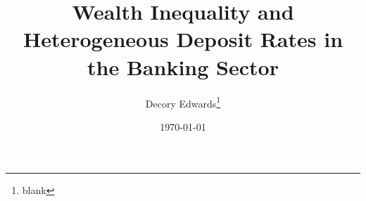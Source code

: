 \documentclass{article}
\title{Wealth Inequality and Heterogeneous Deposit Rates in the Banking Sector}
\author{Decory Edwards\thanks{blank}}
\date{\today}
\begin{document}
\maketitle


\vspace{2em}
\noindent
\begin{abstract}
  \noindent
  
\end{abstract}

\newpage






\FloatBarrier


\FloatBarrier


\clearpage


\printbibliography

\FloatBarrier
\clearpage
\appendix

\end{document}
